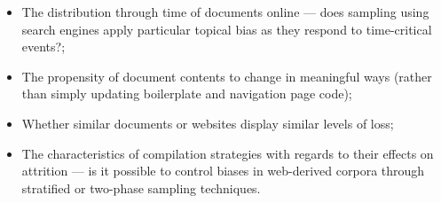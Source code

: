 \begin{itemize}
    \item The distribution through time of documents online --- does sampling using search engines apply particular topical bias as they respond to time-critical events?; %
	\item The propensity of document contents to change in meaningful ways (rather than simply updating boilerplate and navigation page code);
    \item Whether similar documents or websites display similar levels of loss;
    \item The characteristics of compilation strategies with regards to their effects on attrition --- is it possible to control biases in web-derived corpora through stratified or two-phase sampling techniques.
\end{itemize}






